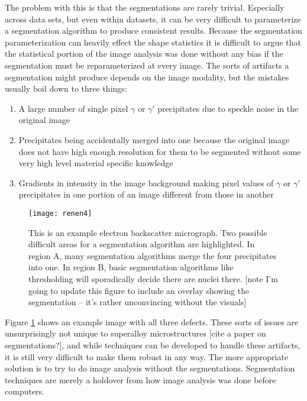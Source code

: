 \documentclass[review]{elsarticle}
\begin{document}
	The problem with this is that the segmentations are rarely trivial. Especially across data sets, but even within datasets, it can be very difficult to parameterize a segmentation algorithm to produce consistent results. Because the segmentation parameterization can heavily effect the shape statistics it is difficult to argue that the statistical portion of the image analysis was done without any bias if the segmentation must be reparameterized at every image. The sorts of artifacts a segmentation might produce depends on the image modality, but the mistakes usually boil down to three things:

	\begin{enumerate}
		\item \label{prob1} A large number of single pixel $\gamma$ or $\gamma'$ precipitates due to speckle noise in the original image
		\item Precipitates being accidentally merged into one because the original image does not have high enough resolution for them to be segmented without some very high level material specific knowledge
		\item Gradients in intensity in the image background making pixel values of $\gamma$ or $\gamma'$ precipitates in one portion of an image different from those in another
	\end{enumerate}
	
	\begin{figure}[!ht]
  		\centering
    	\texttt{[image: renen4]}
  		\caption{This is an example electron backscatter micrograph. Two possible difficult areas for a segmentation algorithm are highlighted. In region A, many segmentation algorithms merge the four precipitates into one. In region B, basic segmentation algorithms like thresholding will sporadically decide there are nuclei there. [note I'm going to update this figure to include an overlay showing the segmentation -- it's rather unconvincing without the visuals] }
  		\label{figure1}
	\end{figure}

	Figure \ref{figure1} shows an example image with all three defects. These sorts of issues are unsurprisingly not unique to superalloy microstructures [cite a paper on segmentations?], and while techniques can be developed to handle these artifacts, it is still very difficult to make them robust in any way. The more appropriate solution is to try to do image analysis without the segmentations. Segmentation techniques are merely a holdover from how image analysis was done before computers.
\end{document}

